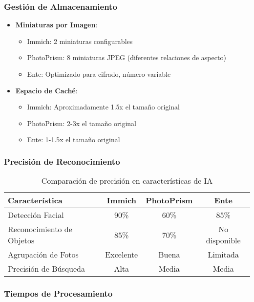 \subsubsection{Gestión de Almacenamiento}

\begin{itemize}
    \item \textbf{Miniaturas por Imagen}:
    \begin{itemize}
        \item Immich: 2 miniaturas configurables
        \item PhotoPrism: 8 miniaturas JPEG (diferentes relaciones de aspecto)
        \item Ente: Optimizado para cifrado, número variable
    \end{itemize}
    
    \item \textbf{Espacio de Caché}:
    \begin{itemize}
        \item Immich: Aproximadamente 1.5x el tamaño original
        \item PhotoPrism: 2-3x el tamaño original
        \item Ente: 1-1.5x el tamaño original
    \end{itemize}
\end{itemize}

\subsubsection{Precisión de Reconocimiento}

\begin{table}[H]
\centering
\begin{tabular}{|l|c|c|c|}
\hline
\textbf{Característica} & \textbf{Immich} & \textbf{PhotoPrism} & \textbf{Ente} \\
\hline
Detección Facial & 90\% & 60\% & 85\% \\
Reconocimiento de Objetos & 85\% & 70\% & No disponible \\
Agrupación de Fotos & Excelente & Buena & Limitada \\
Precisión de Búsqueda & Alta & Media & Media \\
\hline
\end{tabular}
\caption{Comparación de precisión en características de IA}
\label{tab:ai_accuracy}
\end{table}

\subsubsection{Tiempos de Procesamiento}

